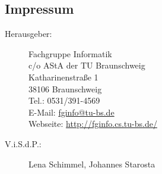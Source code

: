 \newpage
\subsection{Impressum}
\label{impressum}
\begin{description}
\item[Herausgeber:]
	Fachgruppe Informatik\\
	c/o AStA der TU Braunschweig\\
	Katharinenstraße 1\\
	38106 Braunschweig\\
	Tel.: 0531/391-4569\\
	E-Mail: \url{fginfo@tu-bs.de}\\
	Webseite: \url{http://fginfo.cs.tu-bs.de/}
\item[V.i.S.d.P.:]  %
  Lena Schimmel, Johannes Starosta
\end{description}